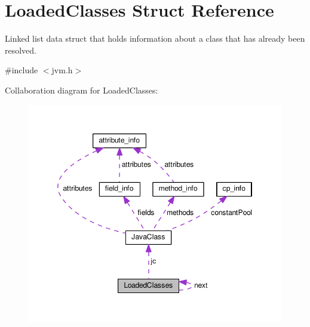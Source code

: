 \hypertarget{structLoadedClasses}{}\section{Loaded\+Classes Struct Reference}
\label{structLoadedClasses}


Linked list data struct that holds information about a class that has already been resolved.  




{\ttfamily \#include $<$jvm.\+h$>$}



Collaboration diagram for Loaded\+Classes\+:\nopagebreak
\begin{figure}[H]
\begin{center}
\leavevmode
\includegraphics[width=349pt]{structLoadedClasses__coll__graph}
\end{center}
\end{figure}
